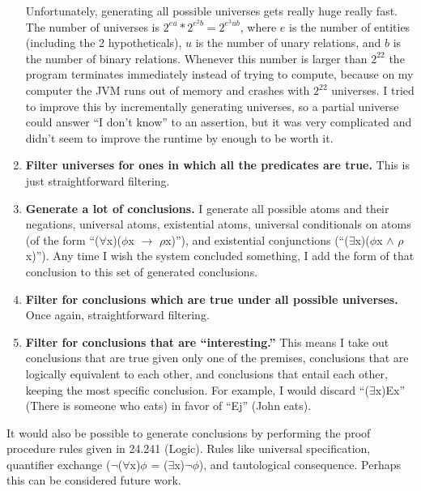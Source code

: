 \documentclass[a4paper, 11pt]{article}
\begin{document}
\begin{enumerate}
 	Unfortunately, generating all possible universes gets really huge really fast. The number of universes is $2^{eu} * 2^{e^2b} = 2^{e^3ub}$, where $e$ is the number of entities (including the 2 hypotheticals), $u$ is the number of unary relations, and $b$ is the number of binary relations. Whenever this number is larger than $2^{22}$ the program terminates immediately instead of trying to compute, because on my computer the JVM runs out of memory and crashes with $2^{22}$ universes. I tried to improve this by incrementally generating universes, so a partial universe could answer ``I don't know'' to an assertion, but it was very complicated and didn't seem to improve the runtime by enough to be worth it.
    \item \textbf{Filter universes for ones in which all the predicates are true.} This is just straightforward filtering.
    \item \textbf{Generate a lot of conclusions.} 
    I generate all possible atoms and their negations, universal atoms, 
    existential atoms, universal conditionals on atoms (of the form 
    ``($\forall$x)($\phi$x $\rightarrow$ $\rho$x)''), and existential conjunctions
    (``($\exists$x)($\phi$x $\wedge$ $\rho$x)''). 
    Any time I wish the system concluded something, 
    I add the form of that conclusion to this set of generated conclusions.
    \item \textbf{Filter for conclusions which are true under all possible universes.} 
    Once again, straightforward filtering.
    \item \textbf{Filter for conclusions that are ``interesting.''} 
    This means I take out conclusions that are true given only one of the premises,
    conclusions that are logically equivalent to each other, 
    and conclusions that entail each other, keeping the most specific conclusion. 
    For example, I would discard ``($\exists$x)Ex'' (There is someone who eats) 
    in favor of ``Ej'' (John eats).
\end{enumerate}
It would also be possible to generate conclusions by performing the proof procedure rules given in 24.241 (Logic). 
Rules like universal specification, quantifier exchange ($\neg$($\forall$x)$\phi$ = ($\exists$x)$\neg\phi$), and tautological consequence. 
Perhaps this can be considered future work.
\end{document}
